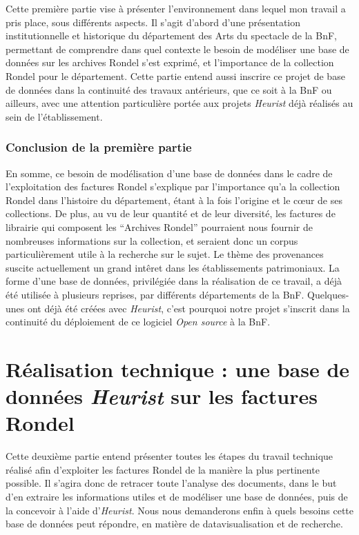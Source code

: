 \documentclass[12pt,twoside]{book}
\begin{document}
Cette première partie vise à présenter l'environnement dans lequel mon travail a pris place, sous différents aspects. Il s'agit d'abord d'une présentation institutionnelle et historique du département des Arts du spectacle de la BnF, permettant de comprendre dans quel contexte le besoin de modéliser une base de données sur les archives Rondel s'est exprimé, et l'importance de la collection Rondel pour le département. Cette partie entend aussi inscrire ce projet de base de données dans la continuité des travaux antérieurs, que ce soit à la BnF ou ailleurs, avec une attention particulière portée aux projets \emph{Heurist} déjà réalisés au sein de l'établissement. 





\section{Conclusion de la première partie}

En somme, ce besoin de modélisation d'une base de données dans le cadre de l'exploitation des factures Rondel s'explique par l'importance qu'a la collection Rondel dans l'histoire du département, étant à la fois l'origine et le cœur de ses collections. De plus, au vu de leur quantité et de leur diversité, les factures de librairie qui composent les \enquote{Archives Rondel} pourraient nous fournir de nombreuses informations sur la collection, et seraient donc un corpus particulièrement utile à la recherche sur le sujet. Le thème des provenances suscite actuellement un grand intêret dans les établissements patrimoniaux. La forme d'une base de données, privilégiée dans la réalisation de ce travail, a déjà été utilisée à plusieurs reprises, par différents départements de la BnF. Quelques-unes ont déjà été créées avec \emph{Heurist}, c'est pourquoi notre projet s'inscrit dans la continuité du déploiement de ce logiciel \emph{Open source} à la BnF.

	
	\part{Réalisation technique : une base de données \emph{Heurist} sur les factures Rondel}

Cette deuxième partie entend présenter toutes les étapes du travail technique réalisé afin d'exploiter les factures Rondel de la manière la plus pertinente possible. Il s'agira donc de retracer toute l'analyse des documents, dans le but d'en extraire les informations utiles et de modéliser une base de données, puis de la concevoir à l'aide d'\emph{Heurist}. Nous nous demanderons enfin à quels besoins cette base de données peut répondre, en matière de datavisualisation et de recherche. 
\end{document}
